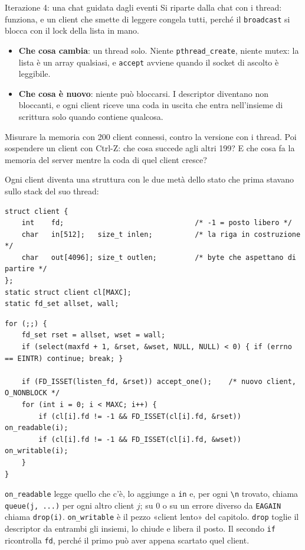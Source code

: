 \begin{esercizio}{Iterazione 4: una chat guidata dagli eventi}
Si riparte dalla chat con i thread: funziona, e un client che smette di leggere congela tutti, perché il
\texttt{broadcast} si blocca con il lock della lista in mano.
\begin{itemize}
    \item \textbf{Che cosa cambia}: un thread solo. Niente \texttt{pthread\_create}, niente mutex: la lista è un array
          qualsiasi, e \texttt{accept} avviene quando il socket di ascolto è leggibile.
    \item \textbf{Che cosa è nuovo}: niente può bloccarsi. I descriptor diventano non bloccanti, e ogni client riceve una
          coda in uscita che entra nell'insieme di scrittura solo quando contiene qualcosa.
\end{itemize}
Misurare la memoria con 200 client connessi, contro la versione con i thread. Poi sospendere un client con Ctrl-Z: che
cosa succede agli altri 199? E che cosa fa la memoria del server mentre la coda di quel client cresce?

\svolgimento
Ogni client diventa una struttura con le due metà dello stato che prima stavano sullo stack del suo thread:

\begin{lstlisting}[language={[POSIX]C}, style=wnumbers, title={chatd.c: lo stato di un client}]
struct client {
    int    fd;                               /* -1 = posto libero */
    char   in[512];   size_t inlen;          /* la riga in costruzione */
    char   out[4096]; size_t outlen;         /* byte che aspettano di partire */
};
static struct client cl[MAXC];
static fd_set allset, wall;
\end{lstlisting}

\begin{lstlisting}[language={[POSIX]C}, style=wnumbers, title={chatd.c: il ciclo}]
for (;;) {
    fd_set rset = allset, wset = wall;
    if (select(maxfd + 1, &rset, &wset, NULL, NULL) < 0) { if (errno == EINTR) continue; break; }

    if (FD_ISSET(listen_fd, &rset)) accept_one();    /* nuovo client, O_NONBLOCK */
    for (int i = 0; i < MAXC; i++) {
        if (cl[i].fd != -1 && FD_ISSET(cl[i].fd, &rset)) on_readable(i);
        if (cl[i].fd != -1 && FD_ISSET(cl[i].fd, &wset)) on_writable(i);
    }
}
\end{lstlisting}

\texttt{on\_readable} legge quello che c'è, lo aggiunge a \texttt{in} e, per ogni \texttt{\textbackslash n} trovato,
chiama \texttt{queue(j, ...)} per ogni altro client $j$; su 0 o su un errore diverso da \texttt{EAGAIN} chiama
\texttt{drop(i)}. \texttt{on\_writable} è il pezzo «client lento» del capitolo. \texttt{drop} toglie il descriptor da
entrambi gli insiemi, lo chiude e libera il posto. Il secondo \texttt{if} ricontrolla \texttt{fd}, perché il primo può
aver appena scartato quel client.


\end{esercizio}
